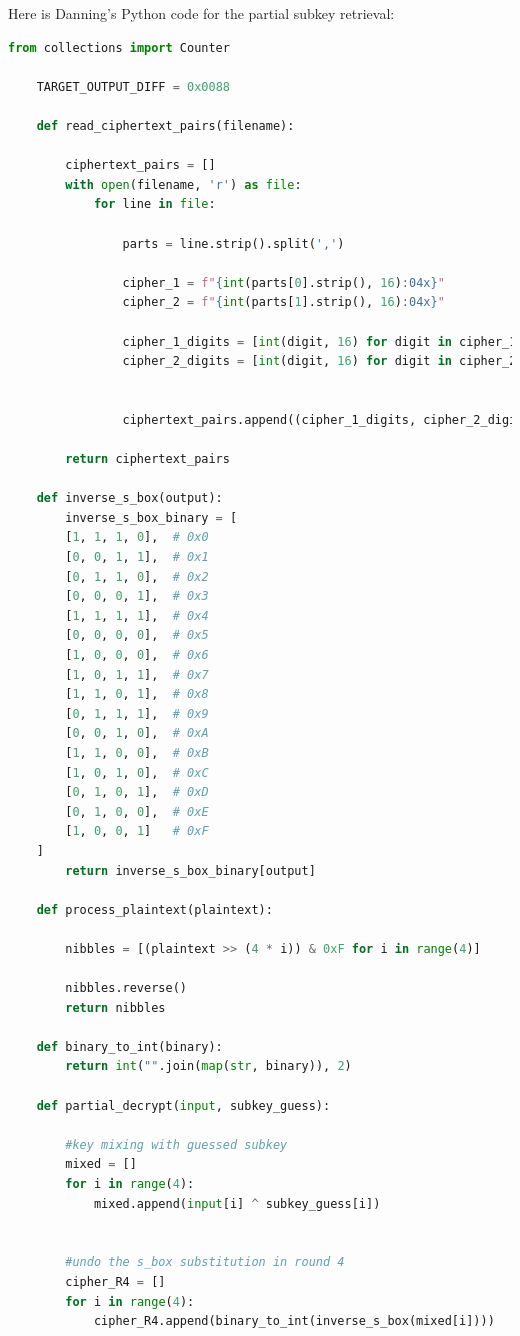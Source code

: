 \documentclass[letterpaper,12pt]{article}
\begin{document}
Here is Danning's Python code for the partial subkey retrieval:
    \begin{lstlisting}[language=Python, caption=Python code subkey retrieval by Danning, label=lts:attD]
    from collections import Counter

    TARGET_OUTPUT_DIFF = 0x0088

    def read_ciphertext_pairs(filename):

        ciphertext_pairs = []
        with open(filename, 'r') as file:
            for line in file:

                parts = line.strip().split(',')
            
                cipher_1 = f"{int(parts[0].strip(), 16):04x}"
                cipher_2 = f"{int(parts[1].strip(), 16):04x}"
    
                cipher_1_digits = [int(digit, 16) for digit in cipher_1]
                cipher_2_digits = [int(digit, 16) for digit in cipher_2]


                ciphertext_pairs.append((cipher_1_digits, cipher_2_digits ))

        return ciphertext_pairs

    def inverse_s_box(output):
        inverse_s_box_binary = [
        [1, 1, 1, 0],  # 0x0
        [0, 0, 1, 1],  # 0x1
        [0, 1, 1, 0],  # 0x2
        [0, 0, 0, 1],  # 0x3
        [1, 1, 1, 1],  # 0x4
        [0, 0, 0, 0],  # 0x5
        [1, 0, 0, 0],  # 0x6
        [1, 0, 1, 1],  # 0x7
        [1, 1, 0, 1],  # 0x8
        [0, 1, 1, 1],  # 0x9
        [0, 0, 1, 0],  # 0xA
        [1, 1, 0, 0],  # 0xB
        [1, 0, 1, 0],  # 0xC
        [0, 1, 0, 1],  # 0xD
        [0, 1, 0, 0],  # 0xE
        [1, 0, 0, 1]   # 0xF
    ]
        return inverse_s_box_binary[output]

    def process_plaintext(plaintext):

        nibbles = [(plaintext >> (4 * i)) & 0xF for i in range(4)]

        nibbles.reverse()
        return nibbles

    def binary_to_int(binary):
        return int("".join(map(str, binary)), 2)

    def partial_decrypt(input, subkey_guess):
    
        #key mixing with guessed subkey
        mixed = []
        for i in range(4):
            mixed.append(input[i] ^ subkey_guess[i])


        #undo the s_box substitution in round 4
        cipher_R4 = []
        for i in range(4):
            cipher_R4.append(binary_to_int(inverse_s_box(mixed[i])))
    

\end{lstlisting}
\end{document}

